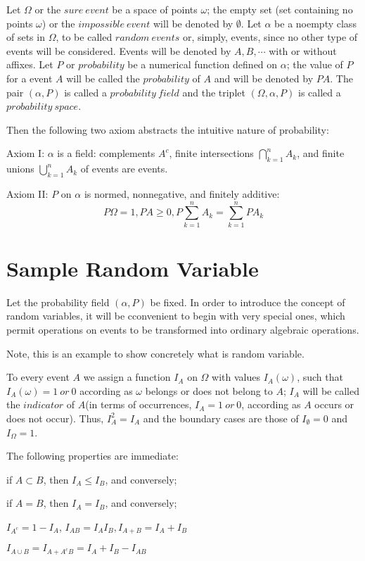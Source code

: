 \documentclass[a4paper]{book}
\begin{document}
	Let $\Omega$ or the $sure\ event$ be a space of points $\omega$; the
	empty set (set containing no points $\omega$) or the $impossible\
	event$ will be denoted by $\emptyset$. Let $\alpha$ be a noempty class
	of sets in $\Omega$, to be called $random\ events$ or, simply, events,
	since no other type of events will be considered. Events will be
	denoted by $A,B, \cdots$ with or without affixes. Let $P$ or
	$probability$ be a numerical function defined on $\alpha$; the value
	of $P$ for a event $A$ will be called the $probability$ of $A$ and
	will be denoted by $PA$. The pair $(\alpha,P)$ is called a
	$probability\ field$ and the triplet $(\Omega, \alpha, P)$ is called a
	$probability\ space$.\cite{1977probability}

	Then the following two axiom abstracts the intuitive nature of
	probability:\cite{1977probability}

	Axiom I: $\alpha$ is a field: complements $A^c$, finite intersections
	$\bigcap\limits^n_{k=1}A_k$, and finite unions
	$\bigcup\limits^n_{k=1}A_k$ of events are events.

	Axiom II: $P$ on $\alpha$ is normed, nonnegative, and finitely
	additive:
	\begin{displaymath}
		P\Omega = 1, PA \geq 0, P\sum\limits^{n}_{k=1}A_k =
		\sum\limits^{n}_{k=1}PA_k
	\end{displaymath}

\section{Sample Random Variable}

	Let the probability field $(\alpha, P)$ be fixed. In order to
	introduce the concept of random variables, it will be cconvenient to
	begin with very special ones, which permit operations on events to be
	transformed into ordinary algebraic operations.\cite{1977probability}

	Note, this is an example to show concretely what is random variable.

	To every event $A$ we assign a function $I_A$ on $\Omega$ with values
	$I_A(\omega)$, such that $I_A(\omega) = 1\ or\ 0$ according as
	$\omega$ belongs or does not belong to $A$; $I_A$ will be called the
	$indicator$ of $A$(in terms of occurrences, $I_A = 1\ or\ 0$,
	according as $A$ occurs or does not occur). Thus, $I_A^2 = I_A$ and
	the boundary cases are those of $I_\emptyset = 0$ and $I_\Omega =
	1$.\cite{1977probability}

	The following properties are immediate\cite{1977probability}:
	\begin{compactitem}
	\item if $A \subset B$, then $I_A \leq I_B$, and conversely;
	\item if $A = B$, then $I_A = I_B$, and conversely;
	\item $I_{A^c} = 1 - I_A$, $I_{AB} = I_AI_B, I_{A+B} = I_A + I_B$
	\item $I_{A\cup B} = I_{A+A^cB} = I_A + I_B - I_{AB}$
	\end{compactitem}
\end{document}
